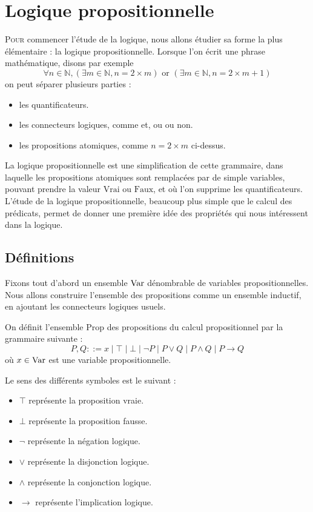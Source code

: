\chapter{Logique propositionnelle}
\label{chp.logprop}

\minitoc

\lettrine{P}{our} commencer l'étude de la logique, nous allons étudier sa forme
la plus élémentaire : la logique propositionnelle. Lorsque l'on écrit une phrase
mathématique, disons par exemple
\[\forall n \in \mathbb N, (\exists m \in \mathbb N, n = 2\times m) \text{ or }
(\exists m \in \mathbb N, n = 2 \times m + 1)\]
on peut séparer plusieurs parties :
\begin{itemize}
\item les quantificateurs.
\item les connecteurs logiques, comme \og et\fg{}, \og ou\fg{} ou \og non\fg{}.
\item les propositions atomiques, comme $n = 2 \times m$ ci-dessus.
\end{itemize}

La logique propositionnelle est une simplification de cette grammaire, dans
laquelle les propositions atomiques sont remplacées par de simple variables,
pouvant prendre la valeur $\mathrm{Vrai}$ ou $\mathrm{Faux}$, et où l'on
supprime les quantificateurs. L'étude de la logique propositionnelle, beaucoup
plus simple que le calcul des prédicats, permet de donner une première idée des
propriétés qui nous intéressent dans la logique.

\section{Définitions}

Fixons tout d'abord un ensemble $\operatorname{Var}$ dénombrable de variables
propositionnelles. Nous allons construire l'ensemble des propositions comme un
ensemble inductif, en ajoutant les connecteurs logiques usuels.

\begin{definition}[Propositions]
  On définit l'ensemble $\mathrm{Prop}$ des propositions du calcul
  propositionnel par la grammaire suivante :
  \[P,Q ::= x \mid \top \mid \bot \mid \lnot P \mid P \lor Q \mid P \land Q
  \mid P \to Q\]
  où $x\in \operatorname{Var}$ est une variable propositionnelle.
\end{definition}

Le sens des différents symboles est le suivant :
\begin{itemize}
\item $\top$ représente la proposition vraie.
\item $\bot$ représente la proposition fausse.
\item $\lnot$ représente la négation logique.
\item $\lor$ représente la disjonction logique.
\item $\land$ représente la conjonction logique.
\item $\to$ représente l'implication logique.
\end{itemize}

